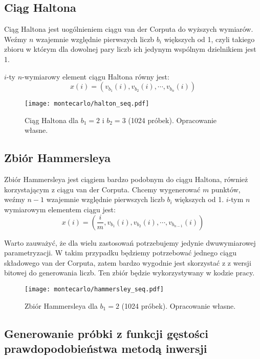 \documentclass[../main.tex]{subfiles}
\begin{document}
\subsection{Ciąg Haltona}

Ciąg Haltona jest uogólnieniem ciągu van der Corputa do wyższych
wymiarów. Weźmy $n$ wzajemnie względnie pierwszych liczb $b_i$ większych od 1,
czyli takiego zbioru w którym dla dowolnej pary liczb ich jedynym wspólnym
dzielnikiem jest 1.

$i$-ty $n$-wymiarowy element ciągu Haltona równy jest:
\[ 
x(i) = \left( v_{b_1}(i), v_{b_2}(i), \cdots, v_{b_n}(i) \right) 
\]

\begin{figure}[h]
  \centering
  \texttt{[image: montecarlo/halton\_seq.pdf]}
  \caption{Ciąg Haltona dla $b_1=2$ i $b_2=3$ (1024 próbek). Opracowanie własne.}
  \label{fig:HaltonSamples}
\end{figure}

\subsection{Zbiór Hammersleya}

Zbiór Hammersleya jest ciągiem bardzo podobnym do ciągu Haltona, również
korzystającym z ciągu van der Corputa. Chcemy wygenerować $m$ punktów, weźmy
$n-1$ wzajemnie względnie pierwszych liczb $b_i$ większych od 1. $i$-tym $n$
wymiarowym elementem ciągu jest:
\[
  x(i) = \left(
    \frac{i}{m}, v_{b_1}(i), v_{b_2}(i), \cdots, v_{b_{n-1}}(i)
  \right)
\]

Warto zauważyć, że dla wielu zastosowań potrzebujemy jedynie dwuwymiarowej parametryzacji. W takim przypadku będziemy potrzebować jednego ciągu składowego van der Corputa, zatem bardzo wygodnie jest skorzystać z  z wersji bitowej do generowania liczb. Ten zbiór będzie wykorzystywany w kodzie pracy.

\begin{figure}[h]
  \centering
  \texttt{[image: montecarlo/hammersley\_seq.pdf]}
  \caption{Zbiór Hammersleya dla $b_1=2$ (1024 próbek). Opracowanie własne.}
  \label{fig:HammersleySamples}
\end{figure}

\subsection{Generowanie próbki z funkcji gęstości prawdopodobieństwa metodą inwersji}
\label{section:pdfsampling}
\end{document}
